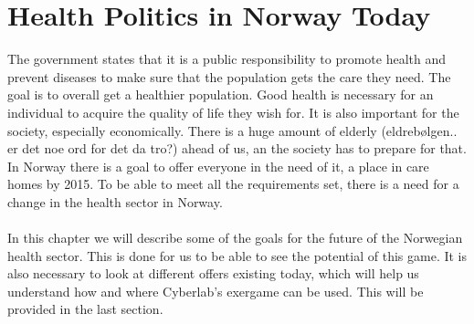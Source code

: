 \chapter{Health Politics in Norway Today}
The government states that it is a public responsibility to promote health and prevent diseases to make sure that the population gets the care they need. The goal is to overall get a healthier population. Good health is necessary for an individual to acquire the quality of life they wish for. It is also important for the society, especially economically. There is a huge amount of elderly (eldrebølgen.. er det noe ord for det da tro?) ahead of us, an the society has to prepare for that. In Norway there is a goal to offer everyone in the need of it, a place in care homes by 2015.  To be able to meet all the requirements set, there is a need for a change in the health sector in Norway.\\ \\
In this chapter we will describe some of the goals for the future of the Norwegian health sector. This is done for us to be able to see the potential of this game.  It is also necessary to look at different offers existing today, which will help us understand how and where Cyberlab's exergame can be used. This will be provided in the last section. 

